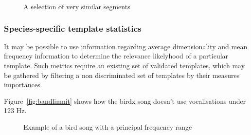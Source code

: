\begin{figure}[!htb]
  \centering
  \begin{subfigure}[h]{0.2\textwidth}
    \centering
    \caption{}
  \end{subfigure}
  \begin{subfigure}[h]{0.2\textwidth}
    \centering
    \caption{}
  \end{subfigure}
  \begin{subfigure}[h]{0.2\textwidth}
    \centering
    \caption{}
  \end{subfigure}
  \begin{subfigure}[h]{0.2\textwidth}
    \centering
    \caption{}
  \end{subfigure}
  \begin{subfigure}[h]{0.2\textwidth}
    \centering
    \caption{}
  \end{subfigure}
  \caption{A selection of very similar segments}
\end{figure}

\subsubsection{Species-specific template statistics}
It may be possible to use information regarding average dimensionality and mean
frequency information to determine the relevance likelyhood of a particular template.
Such metrics require an existing set of validated templates, which may be gathered
by filtering a non discriminated set of templates by their measures importances.

Figure~\ref{fig:bandlimnit} shows how the birdx song doesn't use vocalisations
under 123 Hz.

\begin{figure}[!htb]
  \centering
  \caption{Example of a bird song with a principal frequency range}
  \label{fig:bandlimit}
\end{figure}
